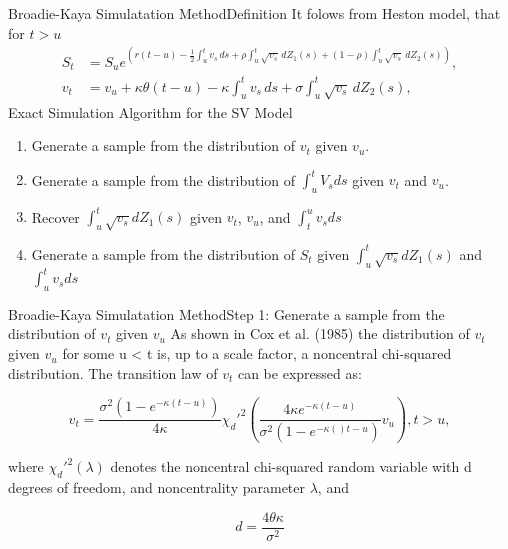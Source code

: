 \begin{frame}{Broadie-Kaya Simulatation Method}{Definition}
    It folows from Heston model, that for $t > u$
    \begin{align}
         S_t &= S_u e^{\left( r(t-u)-\frac{1}{2} \int_{u}^{t} v_s \, ds  + \rho\int_{u}^{t} \sqrt{v_s} \, dZ_1(s) + (1-\rho)\int_{u}^{t} \sqrt{v_s} \, dZ_2(s)  \right)}, \label{BK:Price_int} \\
         v_t &= v_u + \kappa\theta(t-u) - \kappa \int_{u}^{t} v_s \, ds + \sigma\int_{u}^{t} \sqrt{v_s} \, dZ_2(s), \label{BK:Vol_int}
    \end{align}
    Exact Simulation Algorithm for the SV Model
    \begin{enumerate}
        \item[Step 1] Generate a sample from the distribution of $v_t$ given $v_u$.
        \item[Step 2] Generate a sample from the distribution of $\int_{u}^t V_s ds$ given $v_t$ and $v_u$.
        \item[Step 3] Recover $\int_{u}^t \sqrt{v_s} dZ_1(s)$ given $v_t$, $v_u$, and
        $\int_{t}^u v_s ds$
        \item[Step 4] Generate a sample from the distribution of $S_t$ given $\int_{u}^t \sqrt{v_s} dZ_1(s)$ and $\int_{u}^t v_s ds$
    \end{enumerate}
\end{frame}

\begin{frame}{Broadie-Kaya Simulatation Method}{Step 1: Generate a sample from the distribution of $v_t$ given $v_u$}
    As shown in Cox et al. (1985) the distribution of $v_t$ given $v_u$ for some u < t is, up to a  scale factor, a noncentral chi-squared distribution. The transition law of $v_t$ can be expressed as:

    \begin{equation}
        v_t = \frac{\sigma^2(1-e^{-\kappa(t-u)})}{4\kappa}\chi_d'^{2}\left(\frac{4\kappa e^{-\kappa(t-u)}}{\sigma^2(1-e^{-\kappa()t-u})} v_u  \right), t > u , \label{BK:vol_law}
    \end{equation}

    where $\chi_d'^{2}(\lambda)$ denotes the noncentral chi-squared random
    variable with d degrees of freedom, and noncentrality
    parameter $\lambda$, and

    \begin{equation}
        d = \frac{4\theta\kappa}{\sigma^2} \label{BK:vol_law:parameter}
    \end{equation}
    
\end{frame}


